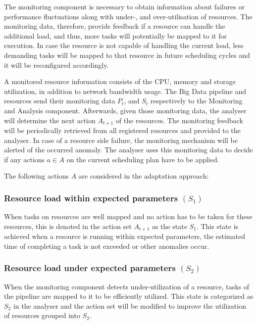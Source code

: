             The monitoring component is necessary to obtain information about failures or performance fluctuations along with under-, and over-utilisation of resources.
            The monitoring data, therefore, provide feedback if a resource can handle the additional load, and thus, more tasks will potentially be mapped to it for execution. 
            In case the resource is not capable of handling the current load, less demanding tasks will be mapped to that resource in future scheduling cycles and it will be reconfigured accordingly.

            A monitored resource information consists of the CPU, memory and storage utilization, in addition to network bandwidth usage.
            The Big Data pipeline and resources send their monitoring data $P_t$, and $S_t$ respectively to the Monitoring and Analysis component.
            Afterwards, given those monitoring data, the analyser will determine the next action $A_{t+1}$ of the resources.
            The monitoring feedback will be periodically retrieved from all registered resources and provided to the analyser.
            In case of a resource side failure, the monitoring mechanism will be alerted of the occurred anomaly.  
            The analyser uses this monitoring data to decide if any actions $a \in A$ on the current scheduling plan have to be applied.
  
            The following actions $A$ are considered in the adaptation approach:

            \subsubsection*{Resource load within expected parameters $(S_1)$} 

            When tasks on resources are well mapped and no action has to be taken for these resources, this is denoted in the action set $A_{t+1}$ as the state $S_1$. This state is achieved when a resource is running within expected parameters, the estimated time of completing a task is not exceeded or other anomalies occur.

            \subsubsection*{Resource load under expected parameters $(S_2)$}

            When the monitoring component detects under-utilization of a resource, tasks of the pipeline are mapped to it to be efficiently utilized. This state is categorized as $S_2$ in the analyser and the action set will be modified to improve the utilization of resources grouped into $S_2$. 

